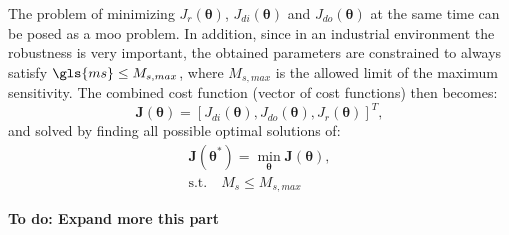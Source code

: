 The problem of minimizing $J_r(\bm{\theta})$, $J_{di}(\bm{\theta})$ and $J_{do}(\bm{\theta})$ at the same time can be posed as a \gls{moo} problem. In addition, since in an industrial environment the robustness is very important, the obtained parameters are constrained to always satisfy  $\gls{ms} \leq M_{s,max}$, where $M_{s,max}$ is the allowed limit of the maximum sensitivity. The combined cost function (vector of cost functions) then becomes:
%
\begin{equation}  %
\textbf{J}(\bm{\theta})=\left[J_{di}(\bm{\theta}), J_{do}(\bm{\theta}), J_{r}(\bm{\theta})\right]^T,
\label{eq:Jtotal}
\end{equation}
%
and solved by finding all possible optimal solutions of:
%
\begin{equation}  %
\begin{gathered}
\textbf{J}(\bm{\theta}^*) = \min_{\bm{\theta}} \textbf{J}(\bm{\theta}),\\
\text{s.t.} \quad  M_s \leq M_{s,max}
\end{gathered}
\label{eq:probmoo}
\end{equation}

\textbf{To do: Expand more this part}